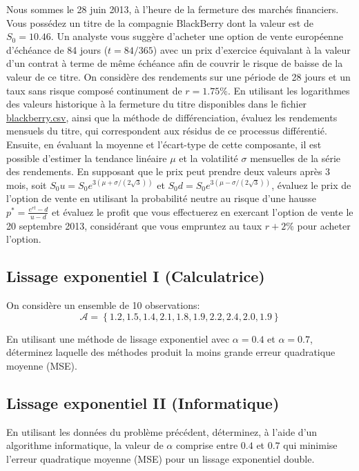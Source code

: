 \documentclass[11pt,english,francais]{article}
\begin{document}
Nous sommes le 28 juin 2013, à l'heure de la fermeture des marchés
financiers. Vous possédez un titre de la compagnie BlackBerry dont la
valeur est de $S_0 = 10.46$. Un analyste vous suggère d'acheter une
option de vente européenne d'échéance de 84 jours ($t=84/365$) avec un prix d'exercice
équivalant à la valeur d'un contrat à terme de même échéance afin de
couvrir le risque de baisse de la valeur de ce titre. On considère des
rendements sur une période de 28 jours et un taux sans risque composé
continument de $r=1.75\%$.  En utilisant les logarithmes des valeurs
historique à la fermeture du titre disponibles dans le fichier
\url{blackberry.csv}, ainsi que la méthode de différenciation,
évaluez les rendements mensuels du titre, qui correspondent aux
résidus de ce processus différentié. Ensuite, en évaluant la moyenne
et l'écart-type de cette composante, il est possible d'estimer la
tendance linéaire $\mu$ et la volatilité $\sigma$ mensuelles de la
série des rendements. En supposant que le prix peut prendre deux
valeurs après 3 mois, soit $S_0u = S_0 e^{3(\mu+\sigma/(2\sqrt{3}))}$
et $S_0d = S_0 e^{3(\mu-\sigma/(2\sqrt{3}))}$, évaluez le prix de
l'option de vente en utilisant la probabilité neutre au risque d'une
hausse $p^{*} = \frac{e^{rt}-d}{u-d}$ et évaluez le profit que vous
effectuerez en exercant l'option de vente le 20 septembre 2013,
considérant que vous empruntez au taux $r+2\%$ pour acheter l'option.

\subsection{Lissage exponentiel I (Calculatrice)}

On considère un ensemble de 10 observations:
\[
\mathcal{A}=\left\{1.2,1.5,1.4,2.1,1.8,1.9,2.2,2.4,2.0,1.9 \right\}
\]

En utilisant une méthode de lissage exponentiel avec $\alpha=0.4$ et
$\alpha=0.7$, déterminez laquelle des méthodes produit la moins grande
erreur quadratique moyenne (MSE).

\subsection{Lissage exponentiel II (Informatique)}

En utilisant les données du problème précédent, déterminez, à l'aide
d'un algorithme informatique, la valeur de $\alpha$ comprise entre $0.4$ et $0.7$ qui minimise l'erreur quadratique moyenne (MSE) pour un lissage exponentiel double.
\end{document}
